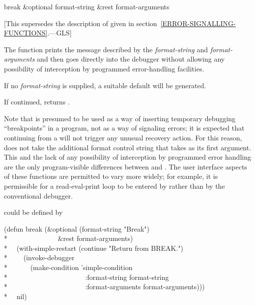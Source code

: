 \begin{defun}[Function]
break &optional format-string &rest format-arguments

   [This supersedes the description of 
   given in section~\ref{ERROR-SIGNALLING-FUNCTIONS}.---GLS]

  The function  prints the message described by the
  \emph{format-string} and \emph{format-arguments} and then
  goes directly into the debugger without allowing any possibility of
  interception by programmed error-handling facilities.

  If no \emph{format-string} is supplied, a suitable default will be generated.

  If continued,  returns .

  Note that  is presumed to be used as a way of inserting temporary debugging
  ``breakpoints'' in a program, not as a way of signaling errors; it is
  expected that continuing from a  will not trigger any unusual recovery
  action. For this reason,  does not take the additional format control
  string that  takes as its first argument. This and the lack of any
  possibility of interception by programmed error handling are the only
  program-visible differences between  and . The user interface
  aspects of these functions are permitted to vary more widely; for example,
  it is permissible for a read-eval-print loop to be entered by  rather
  than by the conventional debugger.

   could be defined by
\begin{lisp}
(defun break (\&optional (format-string "Break") \\*
~~~~~~~~~~~~~~\&rest format-arguments) \\*
~~(with-simple-restart (continue "Return from BREAK.") \\*
~~~~(invoke-debugger \\*
~~~~~~(make-condition 'simple-condition \\*
~~~~~~~~~~~~~~~~~~~~~~:format-string format-string \\*
~~~~~~~~~~~~~~~~~~~~~~:format-arguments format-arguments))) \\*
~~nil)
\end{lisp}
\end{defun}

